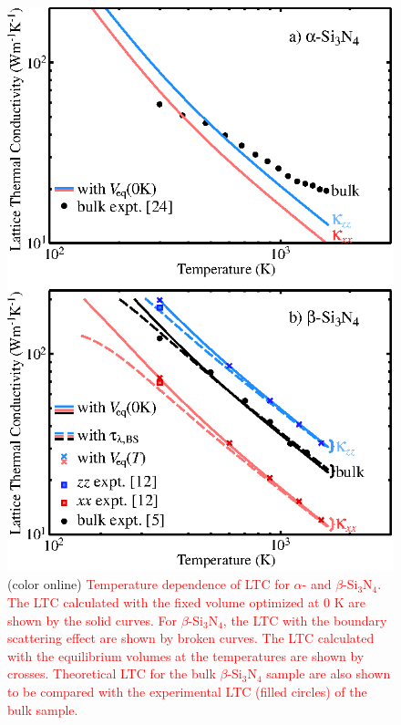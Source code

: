 \documentclass[twocolumn,amsmath,amssymb,a4paper,prb,superscriptaddress,floatfix]{revtex4-1}
\begin{document}
\begin{figure}[ht]
 \begin{center}
  \includegraphics[width=0.90\linewidth]{Fig1.eps} \caption{(color
  online) \textcolor{red}{Temperature dependence of LTC for $\alpha$-
  and $\beta$-Si$_3$N$_4$. The LTC calculated with the fixed volume
  optimized at 0 K are shown by the solid curves. For
  $\beta$-Si$_3$N$_4$, the LTC with the boundary scattering effect are
  shown by broken curves. The LTC calculated with the equilibrium
  volumes at the temperatures are shown by crosses. Theoretical LTC for
  the bulk $\beta$-Si$_3$N$_4$ sample are also shown to be compared with
  the experimental LTC (filled circles) of the bulk sample.}
  \label{fig:Fig1_338} }
 \end{center}
\end{figure}
\end{document}
